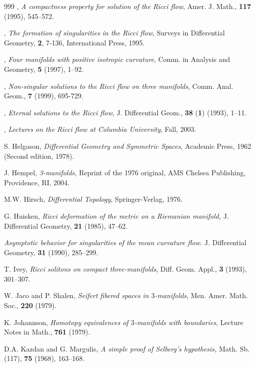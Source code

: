 \begin{thebibliography}{999}
 \bysame,
{\it A compactness property for solution of the Ricci flow}, Amer.
J. Math., {\bf 117} (1995), 545--572.

 \bysame,
{\it The formation of singularities in the Ricci flow}, Surveys in
Differential Geometry, {\bf 2}, 7-136, International Press, 1995.

 \bysame,
{\it Four manifolds with positive isotropic curvature}, Comm. in
Analysis and Geometry, {\bf 5} (1997), 1--92.

 \bysame,
{\it Non-singular solutions to the Ricci flow on three manifolds},
Comm. Anal. Geom., {\bf 7} (1999), 695-729.

 \bysame,
{\it Eternal solutions to the Ricci flow}, J. Differential Geom.,
\textbf{38 }({\bf 1}) (1993), 1--11.

 \bysame,
{\it Lectures on the Ricci flow at Columbia University}, Fall,
2003.

 S. Helgason,
{\it Differential Geometry and Symmetric Spaces}, Academic Press,
1962 (Second edition, 1978).

 J. Hempel,
{\it 3-manifolds,} Reprint of the 1976 original, AMS Chelsea
Publishing, Providence, RI, 2004.

 M.W. Hirsch,
{\it Differential Topology}, Springer-Verlag, 1976.

 G. Huisken,
{\it Ricci deformation of the metric on a Riemanian manifold,} J.
Differential Geometry, {\bf 21 } (1985), 47--62.

 \bysame
{\it Asymptotic behavior for singularities of the mean curvature
flow.} J. Differential Geometry, {\bf 31 } (1990), 285--299.

 T. Ivey,
{\it Ricci solitons on compact three-manifolds}, Diff. Geom.
Appl., \textbf{3} (1993), 301--307.

 W. Jaco and P. Shalen,
{\it Seifert fibered spaces in $3$-manifolds}, Men. Amer. Math.
Soc., \textbf{220} (1979).

 K. Johannson,
{\it Homotopy equivalences of $3$-manifolds with boundaries},
Lecture Notes in Math., \textbf{761} (1979).

 D.A. Kazdan and G. Margulis, {\it A simple proof of Selberg's
hypothesis,} Math. Sb. (117), \textbf{75} (1968), 163--168.


\end{thebibliography}
